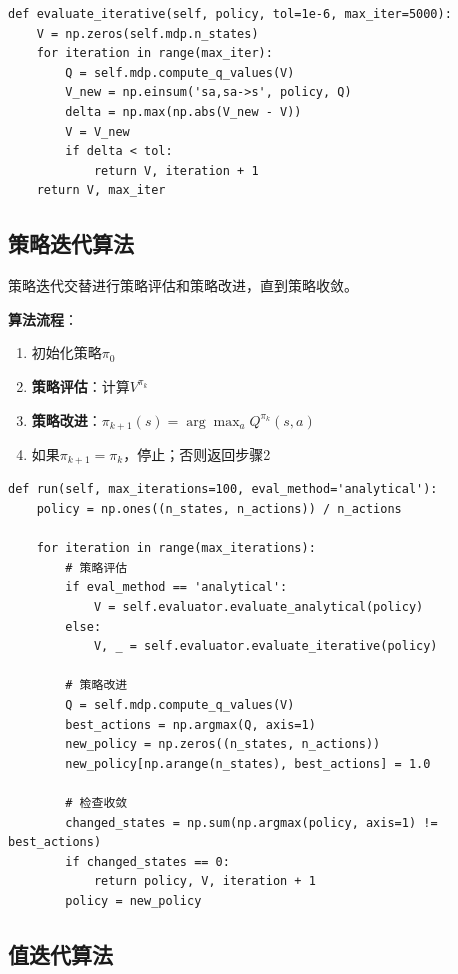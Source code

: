\documentclass[12pt,a4paper]{article}
\begin{document}
\begin{lstlisting}[caption={数值法策略评估}]
def evaluate_iterative(self, policy, tol=1e-6, max_iter=5000):
    V = np.zeros(self.mdp.n_states)
    for iteration in range(max_iter):
        Q = self.mdp.compute_q_values(V)
        V_new = np.einsum('sa,sa->s', policy, Q)
        delta = np.max(np.abs(V_new - V))
        V = V_new
        if delta < tol:
            return V, iteration + 1
    return V, max_iter
\end{lstlisting}

\subsection{策略迭代算法}

策略迭代交替进行策略评估和策略改进，直到策略收敛。

\textbf{算法流程}：
\begin{enumerate}[itemsep=0pt]
    \item 初始化策略$\pi_0$
    \item \textbf{策略评估}：计算$V^{\pi_k}$
    \item \textbf{策略改进}：$\pi_{k+1}(s) = \arg\max_a Q^{\pi_k}(s,a)$
    \item 如果$\pi_{k+1} = \pi_k$，停止；否则返回步骤2
\end{enumerate}

\begin{lstlisting}[caption={策略迭代算法实现}]
def run(self, max_iterations=100, eval_method='analytical'):
    policy = np.ones((n_states, n_actions)) / n_actions
    
    for iteration in range(max_iterations):
        # 策略评估
        if eval_method == 'analytical':
            V = self.evaluator.evaluate_analytical(policy)
        else:
            V, _ = self.evaluator.evaluate_iterative(policy)
        
        # 策略改进
        Q = self.mdp.compute_q_values(V)
        best_actions = np.argmax(Q, axis=1)
        new_policy = np.zeros((n_states, n_actions))
        new_policy[np.arange(n_states), best_actions] = 1.0
        
        # 检查收敛
        changed_states = np.sum(np.argmax(policy, axis=1) != best_actions)
        if changed_states == 0:
            return policy, V, iteration + 1
        policy = new_policy
\end{lstlisting}

\subsection{值迭代算法}
\end{document}
